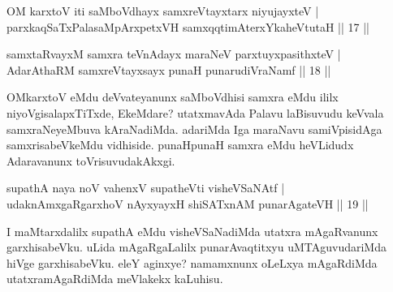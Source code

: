 \begin{shl}
\footnotemark[1]{}OM karxtoV iti saMboVdhayx samxreVtayxtarx niyujayxteV | \\
parxkaqSaTxPalasaMpArxpetxVH samxqqtimAterxYkaheVtutaH \hfill||  17 || 
\end{shl}

\begin{shl}
samxtaRvayxM samxra teVnAdayx maraNeV parxtuyxpasithxteV | \\
AdarAthaRM samxreVtayxsayx punaH punarudiVraNamf \hfill||  18 || 
\end{shl}

\begin{artha} 
OMkarxtoV eMdu deVvateyanunx saMboVdhisi samxra eMdu ililx 
niyoVgisalapxTiTxde, EkeMdare? utatxmavAda Palavu laBisuvudu keVvala 
samxraNeyeMbuva kAraNadiMda. adariMda Iga maraNavu samiVpisidAga 
samxrisabeVkeMdu vidhiside. punaHpunaH samxra eMdu heVLidudx 
Adaravanunx toVrisuvudakAkxgi.
\end{artha}


\begin{shl}
supathA naya noV vahenxV supatheVti visheVSaNAtf | \\
udaknAmxgaRgarxhoV nAyxyayxH shiSATxnAM punarAgateVH \hfill||  19 || 
\end{shl}

\begin{artha} 
I maMtarxdalilx supathA eMdu visheVSaNadiMda utatxra mAgaRvanunx 
garxhisabeVku. uLida mAgaRgaLalilx punarAvaqtitxyu uMTAguvudariMda 
hiVge garxhisabeVku. eleY aginxye? namamxnunx oLeLxya mAgaRdiMda 
utatxramAgaRdiMda meVlakekx kaLuhisu.
\end{artha}

